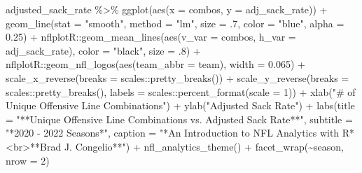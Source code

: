 \documentclass[
  letterpaper,
]{krantz}
\newenvironment{Shaded}{\begin{snugshade}}{\end{snugshade}}
\newcommand{\AttributeTok}[1]{\textcolor[rgb]{0.40,0.45,0.13}{#1}}
\newcommand{\DecValTok}[1]{\textcolor[rgb]{0.68,0.00,0.00}{#1}}
\newcommand{\FloatTok}[1]{\textcolor[rgb]{0.68,0.00,0.00}{#1}}
\newcommand{\FunctionTok}[1]{\textcolor[rgb]{0.28,0.35,0.67}{#1}}
\newcommand{\NormalTok}[1]{\textcolor[rgb]{0.00,0.23,0.31}{#1}}
\newcommand{\SpecialCharTok}[1]{\textcolor[rgb]{0.37,0.37,0.37}{#1}}
\newcommand{\StringTok}[1]{\textcolor[rgb]{0.13,0.47,0.30}{#1}}
\begin{document}
\begin{Shaded}
\begin{Highlighting}[]
\NormalTok{adjusted\_sack\_rate }\SpecialCharTok{\%\textgreater{}\%}
  \FunctionTok{ggplot}\NormalTok{(}\FunctionTok{aes}\NormalTok{(}\AttributeTok{x =}\NormalTok{ combos, }\AttributeTok{y =}\NormalTok{ adj\_sack\_rate)) }\SpecialCharTok{+}
  \FunctionTok{geom\_line}\NormalTok{(}\AttributeTok{stat =} \StringTok{"smooth"}\NormalTok{, }\AttributeTok{method =} \StringTok{"lm"}\NormalTok{,}
            \AttributeTok{size =}\NormalTok{ .}\DecValTok{7}\NormalTok{,}
            \AttributeTok{color =} \StringTok{"blue"}\NormalTok{,}
            \AttributeTok{alpha =} \FloatTok{0.25}\NormalTok{) }\SpecialCharTok{+}
\NormalTok{  nflplotR}\SpecialCharTok{::}\FunctionTok{geom\_mean\_lines}\NormalTok{(}\FunctionTok{aes}\NormalTok{(}\AttributeTok{v\_var =}\NormalTok{ combos, }\AttributeTok{h\_var =}\NormalTok{ adj\_sack\_rate),}
                            \AttributeTok{color =} \StringTok{"black"}\NormalTok{, }\AttributeTok{size =}\NormalTok{ .}\DecValTok{8}\NormalTok{) }\SpecialCharTok{+}
\NormalTok{  nflplotR}\SpecialCharTok{::}\FunctionTok{geom\_nfl\_logos}\NormalTok{(}\FunctionTok{aes}\NormalTok{(}\AttributeTok{team\_abbr =}\NormalTok{ team), }\AttributeTok{width =} \FloatTok{0.065}\NormalTok{) }\SpecialCharTok{+}
  \FunctionTok{scale\_x\_reverse}\NormalTok{(}\AttributeTok{breaks =}\NormalTok{ scales}\SpecialCharTok{::}\FunctionTok{pretty\_breaks}\NormalTok{()) }\SpecialCharTok{+}
  \FunctionTok{scale\_y\_reverse}\NormalTok{(}\AttributeTok{breaks =}\NormalTok{ scales}\SpecialCharTok{::}\FunctionTok{pretty\_breaks}\NormalTok{(),}
                  \AttributeTok{labels =}\NormalTok{ scales}\SpecialCharTok{::}\FunctionTok{percent\_format}\NormalTok{(}\AttributeTok{scale =} \DecValTok{1}\NormalTok{)) }\SpecialCharTok{+}
  \FunctionTok{xlab}\NormalTok{(}\StringTok{"\# of Unique Offensive Line Combinations"}\NormalTok{) }\SpecialCharTok{+}
  \FunctionTok{ylab}\NormalTok{(}\StringTok{"Adjusted Sack Rate"}\NormalTok{) }\SpecialCharTok{+}
  \FunctionTok{labs}\NormalTok{(}\AttributeTok{title =} \StringTok{"**Unique Offensive Line Combinations vs. Adjusted Sack Rate**"}\NormalTok{,}
       \AttributeTok{subtitle =} \StringTok{"*2020 {-} 2022 Seasons*"}\NormalTok{,}
       \AttributeTok{caption =} \StringTok{"*An Introduction to NFL Analytics with R*\textless{}br\textgreater{}**Brad J. Congelio**"}\NormalTok{) }\SpecialCharTok{+}
  \FunctionTok{nfl\_analytics\_theme}\NormalTok{() }\SpecialCharTok{+}
  \FunctionTok{facet\_wrap}\NormalTok{(}\SpecialCharTok{\textasciitilde{}}\NormalTok{season, }\AttributeTok{nrow =} \DecValTok{2}\NormalTok{)}
\end{Highlighting}
\end{Shaded}
\end{document}

